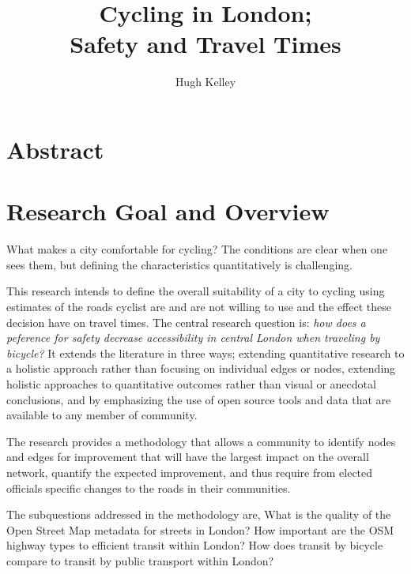 \documentclass[11pt]{article} %
\title{\vspace{-3.0cm}Cycling in London; \\ Safety and Travel Times}
\author{Hugh Kelley}
\begin{document}
\maketitle








\section{Abstract}

\tableofcontents

\listoftables



\section{Research Goal and Overview}

What makes a city comfortable for cycling? The conditions are clear when one sees them, but defining the characteristics quantitatively is challenging. 

This research intends to define the overall suitability of a city to cycling using estimates of the roads cyclist are and are not willing to use and the effect these decision have on travel times. The central research question is: \textit{how does a peference for safety decrease accessibility in central London when traveling by bicycle?} It extends the literature in three ways; extending quantitative research to a holistic approach rather than focusing on individual edges or nodes, extending holistic approaches to quantitative outcomes rather than visual or anecdotal conclusions, and by emphasizing the use of open source tools and data that are available to any member of community. 

The research provides a methodology that allows a community to identify nodes and edges for improvement that will have the largest impact on the overall network, quantify the expected improvement, and thus require from elected officials specific changes to the roads in their communities. 

The subquestions addressed in the methodology are, What is the quality of the Open Street Map metadata for streets in London? How important are the OSM highway types to efficient transit within London? How does transit by bicycle compare to transit by public transport within London? 
\end{document}
